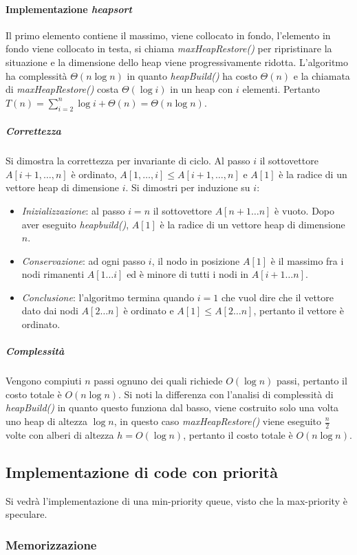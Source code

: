 \paragraph{Implementazione \emph{heapsort}}
Il primo elemento contiene il massimo, viene collocato in fondo, l'elemento in fondo viene collocato in testa, si chiama \emph{maxHeapRestore()} per 
ripristinare la situazione e la dimensione dello heap viene progressivamente ridotta. L'algoritmo ha complessit\`a $\Theta(n\log n)$ in quanto 
\emph{heapBuild()} ha costo $\Theta(n)$ e la chiamata di \emph{maxHeapRestore()} costa $\Theta(\log i)$ in un heap con $i$ elementi. Pertanto 
$T(n)=\sum\limits_{i=2}^n\log i+\Theta(n)=\Theta(n\log n)$.

\subparagraph{Correttezza}
Si dimostra la correttezza per invariante di ciclo. Al passo $i$ il sottovettore $A[i+1,\dots, n]$ \`e ordinato, $A[1,\dots, i]\le A[i+1, \dots, n]$ e 
$A[1]$ \`e la radice di un vettore heap di dimensione $i$. Si dimostri per induzione su $i$: 
\begin{itemize}
	\item \emph{Inizializzazione}: al passo $i=n$ il sottovettore $A[n+1\dots n]$ \`e vuoto. Dopo aver eseguito \emph{heapbuild()}, $A[1]$ \`e la radice di un vettore heap di 
		dimensione $n$.
	\item \emph{Conservazione}: ad ogni passo $i$, il nodo in posizione $A[1]$ \`e il massimo fra i nodi rimanenti $A[1\dots i]$ ed \`e minore di tutti i nodi in $A[i+1\dots n]$. 
	\item \emph{Conclusione}: l'algoritmo termina quando $i = 1$ che vuol dire che il vettore dato dai nodi $A[2\dots n]$ \`e ordinato e $A[1]\le A[2\dots n]$, pertanto il vettore
		\`e ordinato. 
\end{itemize}
\subparagraph{Complessit\`a}
Vengono compiuti $n$ passi ognuno dei quali richiede $O(\log n)$ passi, pertanto il costo totale \`e $O(n\log n)$. Si noti la differenza con l'analisi di complessit\`a di 
\emph{heapBuild()} in quanto questo funziona dal basso, viene costruito solo una volta uno heap di altezza $\log n$, in questo caso \emph{maxHeapRestore()} viene eseguito $\frac{n}{2}$
volte con alberi di altezza $h = O(\log n)$, pertanto il costo totale \`e $O(n\log n)$. 
\subsection{Implementazione di code con priorit\`a}
Si vedr\`a l'implementazione di una min-priority queue, visto che la max-priority \`e speculare. 
\subsubsection{Memorizzazione}


